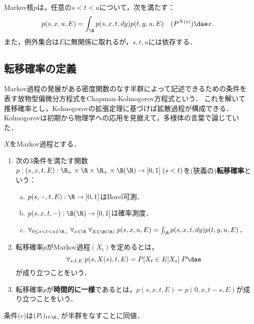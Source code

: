 \documentclass[uplatex,dvipdfmx]{jsreport}
\begin{document}
\begin{proposition}\label{prop-Chapman-Kolmogorov}
    Markov核$p$は，任意の$s<t<u$について，次を満たす：
    \[p(s,x,u,E)=\int_\R p(s,x,t,dy)p(t,y,u,E)\quad(P^{X(s)})\dae x.\]
    また，例外集合は$E$に無関係に取れるが，$s,t,u$には依存する．
\end{proposition}

\subsection{転移確率の定義}

\begin{tcolorbox}[colframe=ForestGreen, colback=ForestGreen!10!white,breakable,colbacktitle=ForestGreen!40!white,coltitle=black,fonttitle=\bfseries\sffamily,
    title=]
    Markov過程の発展がある密度関数のなす半群によって記述できるための条件を表す放物型偏微分方程式をChapman-Kolmogorov方程式という．
    これを解いて推移確率とし，Kolmogorovの拡張定理に基づけば拡散過程が構成できる．
    Kolmogorovは初期から物理学への応用を見据えて，多様体の言葉で論じていた．
\end{tcolorbox}

\begin{definition}
    $X$をMarkov過程とする．
    \begin{enumerate}
        \item 次の3条件を満たす関数$p:(s,x,t,E):\R_+\times\R\times\R_+\times\B(\R)\to[0,1]\;(s<t)$を(狭義の)\textbf{転移確率}という：
        \begin{enumerate}[(a)]
            \item $p(s,-,t,E):\R\to[0,1]$はBorel可測．
            \item $p(s,x,t,-):\B(\R)\to[0,1]$は確率測度．
            \item $\forall_{0\le s<t<u\in\R_+}\;\forall_{x\in\R}\;\forall_{E\in\B(\R)}\;p(s,x,u,E)=\int_\R p(s,x,t,dy)p(t,y,u,E)$．
        \end{enumerate}
        \item 転移確率$p$がMarkov過程$(X_t)$を定めるとは，
        \[\forall_{s,t,E}\;p(s,X(s),t,E)=P[X_t\in E|X_s]\;P\dae\]
        が成り立つことをいう．
        \item 転移確率$p$が\textbf{時間的に一様}であるとは，$p(s,x,t,E)=p(0,x,t-s,E)$が成り立つことをいう．
    \end{enumerate}
\end{definition}
\begin{remarks}
    条件(c)は$(P_t)_{t\in\R_+}$が半群をなすことに同値．
\end{remarks}
\end{document}
